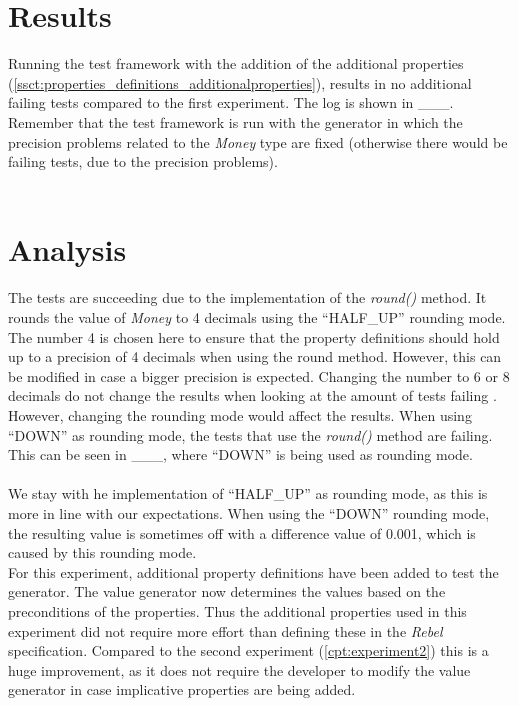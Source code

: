 \section{Results}
Running the test framework with the addition of the additional properties (\autoref{ssct:properties_definitions_additionalproperties}), results in no additional failing tests compared to the first experiment. The log is shown in \_\_\_. Remember that the test framework is run with the generator in which the precision problems related to the \textit{Money} type are fixed (otherwise there would be failing tests, due to the precision problems).
\\
\\

\section{Analysis}
The tests are succeeding due to the implementation of the \textit{round()} method. It rounds the value of \textit{Money} to 4 decimals using the ``HALF\_UP'' rounding mode. The number 4 is chosen here to ensure that the property definitions should hold up to a precision of 4 decimals when using the round method. However, this can be modified in case a bigger precision is expected. Changing the number to 6 or 8 decimals do not change the results when looking at the amount of tests failing . However, changing the rounding mode would affect the results. When using ``DOWN'' as rounding mode, the tests that use the \textit{round()} method are failing. This can be seen in \_\_\_, where ``DOWN'' is being used as rounding mode.\\
\\
We stay with he implementation of ``HALF\_UP'' as rounding mode, as this is more in line with our expectations. When using the ``DOWN'' rounding mode, the resulting value is sometimes off with a difference value of 0.001, which is caused by this rounding mode.
\\
For this experiment, additional property definitions have been added to test the generator. The value generator now determines the values based on the preconditions of the properties. Thus the additional properties used in this experiment did not require more effort than defining these in the \textit{Rebel} specification. Compared to the second experiment (\autoref{cpt:experiment2}) this is a huge improvement, as it does not require the developer to modify the value generator in case implicative properties are being added.

